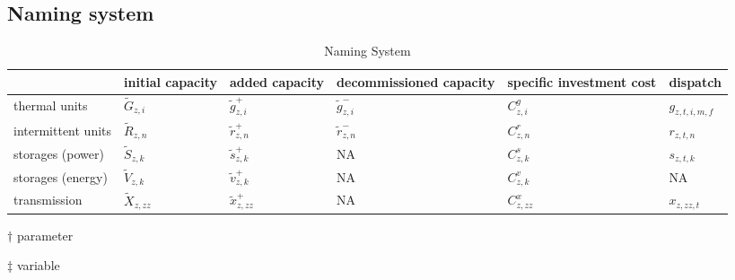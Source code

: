 \documentclass[final, 3p, times]{elsarticle} %
\begin{document}
    \subsection{Naming system}
    \begin{table*}
        \centering
        \begin{threeparttable}
            \caption{Naming System}
            \begin{tabulary}{\textwidth}{LLLLLL}
                \toprule
                & initial capacity\tnote{$\dagger$}    & added capacity\tnote{$\ddagger$}  & decommissioned capacity\tnote{$\ddagger$} & specific investment cost\tnote{$\dagger$} & dispatch\tnote{$\ddagger$}    \\
                \midrule
                thermal units & $\widetilde{G}_{z,i}$                 & $\widetilde{g}^{+}_{z,i}$         & $\widetilde{g}^{-}_{z,i}$                 & $C^{g}_{z,i}$                             & $g_{z,t,i,m,f}$               \\
                intermittent units & $\widetilde{R}_{z,n}$                 & $\widetilde{r}^{+}_{z,n}$         & $\widetilde{r}^{-}_{z,n}$                 & $C^{r}_{z,n}$                             & $r_{z,t,n}$                   \\
                storages (power)    & $\widetilde{S}_{z,k}$                 & $\widetilde{s}^{+}_{z,k}$         & NA & $C^{s}_{z,k}$                             & $s_{z,t,k}$                   \\ %
                storages (energy)   & $\widetilde{V}_{z,k}$                 & $\widetilde{v}^{+}_{z,k}$         & NA & $C^{v}_{z,k}$                             & NA                            \\ %
                transmission & $\widetilde{X}_{z,zz}$                & $\widetilde{x}^{+}_{z,zz}$        & NA & $C^{x}_{z,zz}$                            & $x_{z,zz,t}$                  \\ %
                \bottomrule
            \end{tabulary}

            \begin{tablenotes}
                \item [$\dagger$] parameter
                \item [$\ddagger$] variable
            \end{tablenotes}
        \end{threeparttable}
    \end{table*}
\end{document}
